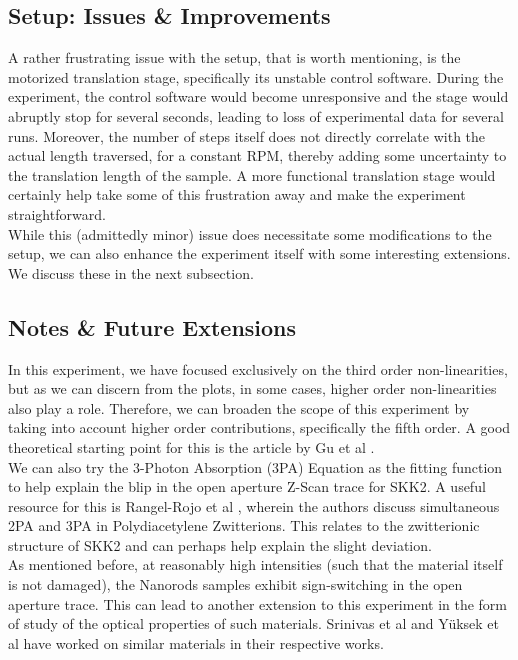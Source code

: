 \documentclass[%
 reprint,
amsmath,
amssymb,
10pt
]{revtex4-2}
\begin{document}
\subsection{\label{issues}Setup: Issues \& Improvements}

A rather frustrating issue with the setup, that is worth mentioning, is the motorized translation stage, specifically its unstable control software. During the experiment, the control software would become unresponsive and the stage would abruptly stop for several seconds, leading to loss of experimental data for several runs. Moreover, the number of steps itself does not directly correlate with the actual length traversed, for a constant RPM, thereby adding some uncertainty to the translation length of the sample. A more functional translation stage would certainly help take some of this frustration away and make the experiment straightforward.\\

While this (admittedly minor) issue does necessitate some modifications to the setup, we can also enhance the experiment itself with some interesting extensions. We discuss these in the next subsection. 

\subsection{\label{future}Notes \& Future Extensions}

In this experiment, we have focused exclusively on the third order non-linearities, but as we can discern from the plots, in some cases, higher order non-linearities also play a role. Therefore, we can broaden the scope of this experiment by taking into account higher order contributions, specifically the fifth order. A good theoretical starting point for this is the article by Gu et al \cite{gu}.\\

We can also try the 3-Photon Absorption (3PA) Equation as the fitting function to help explain the blip in the open aperture Z-Scan trace for SKK2. A useful resource for this is Rangel-Rojo et al \cite{3pa}, wherein the authors discuss simultaneous 2PA and 3PA in Polydiacetylene Zwitterions. This relates to the zwitterionic structure of SKK2 and can perhaps help explain the slight deviation.\\

As mentioned before, at reasonably high intensities (such that the material itself is not damaged), the Nanorods samples exhibit sign-switching in the open aperture trace. This can lead to another extension to this experiment in the form of study of the optical properties of such materials. Srinivas et al \cite{srini} and Yüksek et al \cite{yuk} have worked on similar materials in their respective works.\\
\end{document}
